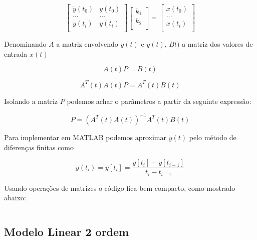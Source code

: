 \documentclass[a4paper,11pt]{article}
\begin{document}
\begin{equation}
\left[\begin{array}{cc}
    \dot{y}(t_0) & y(t_0)\\
    \dots  & \dots \\
    \dot{y}(t_i) & y(t_i)\\
\end{array} \right]
\left[\begin{array}{c}
    k_1\\
    k_2\\
\end{array} \right]
=
\left[\begin{array}{c}
    x(t_0)  \\
    \dots\\
    x(t_i)  \\
\end{array} \right]
\end{equation}


Denominando $A$ a matriz envolvendo $\dot{y}(t)$ e $y(t)$, $Bt)$ a matriz dos valores de entrada $x(t)$

\begin{equation}
    A(t) P = B(t)
\end{equation}

\begin{equation}
    A^T(t)A(t) P = A^T(t) B(t)
\end{equation}

Isolando a matriz $P$ podemos achar o parâmetros a partir da seguinte expressão:

\begin{equation}
    P = \left(A^T(t) A(t)\right)^{-1} A^T(t) B(t)
\end{equation}

Para implementar em MATLAB podemos aproximar $\dot{y}(t)$ pelo método de diferenças finitas como

\begin{equation}
\dot{y}(t_i) = \dot{y}[t_i] = \frac{y[t_i] - y[t_{i-1}]}{t_i - t_{i-1}}
\end{equation}

Usando operações de matrizes o código fica bem compacto, como mostrado abaixo:

\inputminted[frame=single,framesep=10pt]{matlab}{../src/matlab/firstordertf.m}

\subsection{Modelo Linear 2 ordem}
\end{document}
